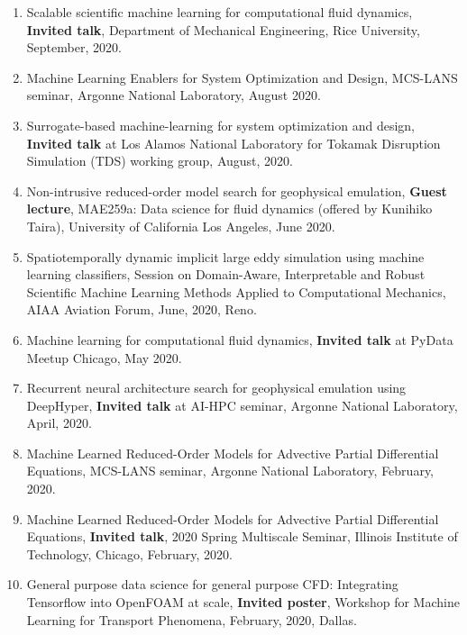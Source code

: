 \documentclass[letterpaper]{article}
\begin{document}
\begin{enumerate}
\item Scalable scientific machine learning for computational fluid dynamics, \textbf{Invited talk}, Department of Mechanical Engineering, Rice University, September, 2020.

\item Machine Learning Enablers for System Optimization and Design, MCS-LANS seminar, Argonne National Laboratory, August 2020.

\item Surrogate-based machine-learning for system optimization and design, \textbf{Invited talk} at Los Alamos National Laboratory for Tokamak Disruption Simulation (TDS) working group, August, 2020.

\item Non-intrusive reduced-order model search for geophysical emulation, \textbf{Guest lecture}, MAE259a: Data science for fluid dynamics (offered by Kunihiko Taira), University of California Los Angeles, June 2020.

\item Spatiotemporally dynamic implicit large eddy simulation using machine learning classifiers, Session on Domain-Aware, Interpretable and Robust Scientific Machine Learning Methods Applied to Computational Mechanics, AIAA Aviation Forum, June, 2020, Reno. 

\item Machine learning for computational fluid dynamics, \textbf{Invited talk} at PyData Meetup Chicago, May 2020.

\item Recurrent neural architecture search for geophysical emulation using DeepHyper, \textbf{Invited talk} at AI-HPC seminar, Argonne National Laboratory, April, 2020.

\item Machine Learned Reduced-Order Models for Advective Partial Differential Equations, MCS-LANS seminar, Argonne National Laboratory, February, 2020.

\item Machine Learned Reduced-Order Models for Advective Partial Differential Equations, \textbf{Invited talk}, 2020 Spring Multiscale Seminar, Illinois Institute of Technology, Chicago, February, 2020.

\item General purpose data science for general purpose CFD: Integrating Tensorflow into OpenFOAM at scale, \textbf{Invited poster}, Workshop for Machine Learning for Transport Phenomena, February, 2020, Dallas.


\end{enumerate}
\end{document}
